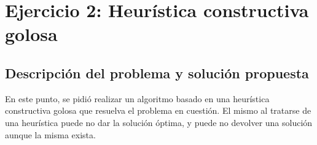 \section{Ejercicio 2: Heurística constructiva golosa}


    \subsection{Descripción del problema y solución propuesta}
        En este punto, se pidió realizar un algoritmo basado en una heurística constructiva golosa que resuelva el problema en cuestión. El mismo al tratarse de una heurística puede no dar la solución óptima, y puede no devolver una solución aunque la misma exista.

